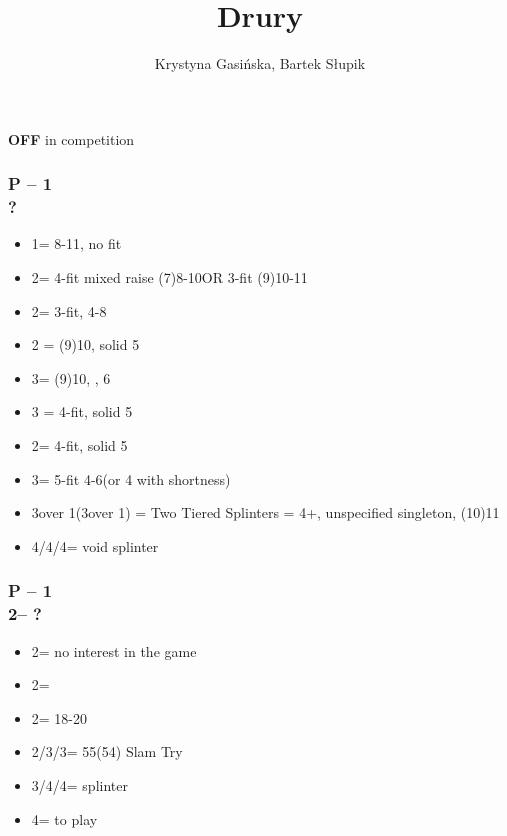 \documentclass[12pt, a4paper]{article}
\title{Drury}
\author{Krystyna Gasińska, Bartek Słupik}
\begin{document}
\maketitle


{\textbf{OFF}} in competition

\subsubsection*{P -- 1\majs \\ ?}
\begin{itemize}
    \item 1\nt = 8-11, no fit
    \item 2\clubs = 4-fit mixed raise (7)8-10\dps OR 3-fit (9)10-11\dps
    \item 2\majs = 3-fit, 4-8\dps
    \item 2 = (9)10, solid 5
    \item 3\clubs = (9)10, \inv, 6\clubs
    \item 3 = 4-fit, solid 5
    \item 2\nt = 4-fit, solid 5\clubs
    \item 3\majs = 5-fit 4-6\dps (or 4 with shortness)
    \item 3\nt over 1\spades (3\spades over 1\hearts) = Two Tiered Splinters = 4+\majs, unspecified singleton, (10)11\dps
    \item 4\clubs/4\diams/4\hearts = void splinter
\end{itemize}

\subsubsection*{P -- 1\hearts \\ 2\clubs -- ?}
\begin{itemize}
    \item 2\hearts = no interest in the game
    \item 2\diams = \inv
    \item 2\nt = 18-20 \bal
    \item 2\spades/3\clubs/3\diams = 55(54) Slam Try
    \item 3\spades/4\clubs/4\diams = splinter
    \item 4\hearts = to play
\end{itemize}
\end{document}
